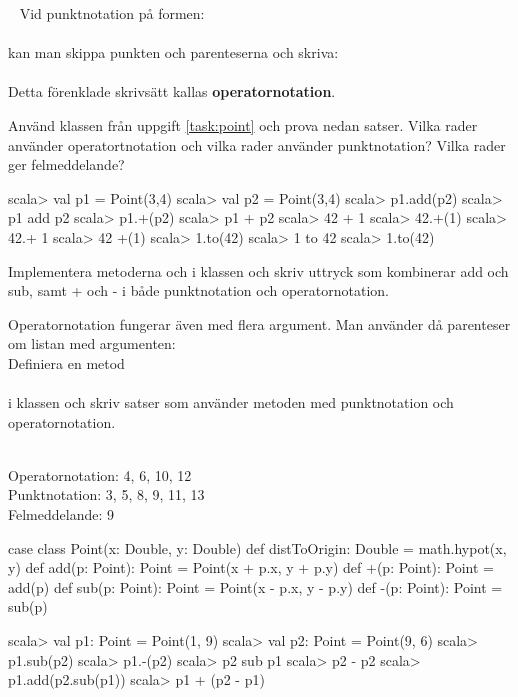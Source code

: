 
\QUESTBEGIN

\Task  \what~  Vid punktnotation på formen: \\  \\ kan man skippa punkten och parenteserna och skriva:\\   \\
Detta förenklade skrivsätt kallas \textbf{operatornotation}.

\Subtask Använd klassen  från uppgift \ref{task:point} och prova nedan satser. Vilka rader använder operatortnotation och vilka rader använder punktnotation? Vilka rader ger felmeddelande?
\begin{REPL}
scala> val p1 = Point(3,4)
scala> val p2 = Point(3,4)
scala> p1.add(p2)
scala> p1 add p2
scala> p1.+(p2)
scala> p1 + p2
scala> 42 + 1
scala> 42.+(1)
scala> 42.+ 1
scala> 42 +(1)
scala> 1.to(42)
scala> 1 to 42
scala> 1.to(42)
\end{REPL}

\Subtask Implementera metoderna  och \code{-} i klassen  och skriv uttryck som kombinerar add och sub, samt + och - i både punktnotation och operatornotation.

\Subtask Operatornotation fungerar även med flera argument. Man använder då parenteser om listan med argumenten:
  \\
Definiera en metod \\
 \\
i klassen  och skriv satser som använder metoden med punktnotation och operatornotation.





\SOLUTION


\TaskSolved \what
 

\SubtaskSolved 
\\Operatornotation:	4, 6, 10, 12
\\Punktnotation:		3, 5, 8, 9, 11, 13
\\Felmeddelande:		9

\SubtaskSolved 
\begin{Code}
case class Point(x: Double, y: Double) {
  def distToOrigin: Double = math.hypot(x, y)
  def add(p: Point): Point = Point(x + p.x, y + p.y)
  def +(p: Point): Point = add(p)
  def sub(p: Point): Point = Point(x - p.x, y - p.y)
  def -(p: Point): Point = sub(p)
}
\end{Code}
\begin{REPL}
scala> val p1: Point = Point(1, 9)
scala> val p2: Point = Point(9, 6)
scala> p1.sub(p2)
scala> p1.-(p2)
scala> p2 sub p1
scala> p2 - p2
scala> p1.add(p2.sub(p1))
scala> p1 + (p2 - p1)
\end{REPL}

